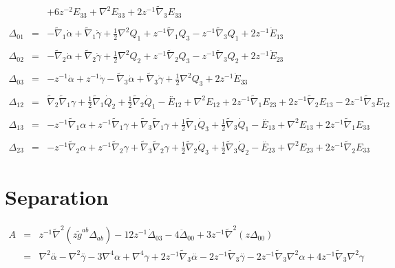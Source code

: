 \documentclass[10pt,letterpaper]{article}
\numberwithin{equation}{section}
\begin{document}
\begin{eqnarray}
&& + 6 z^{-2} E_{33} + \nabla^{2}{}E_{33} + 2 z^{-1} \tilde{\nabla}_{3}E_{33}
\\  \nonumber\\ 
\Delta_{01}&=& - \tilde{\nabla}_{1}\dot{\alpha} + \tilde{\nabla}_{1}\dot{\gamma}+\tfrac{1}{2} \nabla^{2}{}Q_{1} + z^{-1} \tilde{\nabla}_{1}Q_{3} -  z^{-1} \tilde{\nabla}_{3}Q_{1}+2 z^{-1} \dot{E}_{13}
\\  \nonumber\\ 
\Delta_{02}&=& - \tilde{\nabla}_{2}\dot{\alpha} + \tilde{\nabla}_{2}\dot{\gamma}+\tfrac{1}{2} \nabla^{2}{}Q_{2} + z^{-1} \tilde{\nabla}_{2}Q_{3} -  z^{-1} \tilde{\nabla}_{3}Q_{2}+2 z^{-1} \dot{E}_{23}
\\  \nonumber\\ 
\Delta_{03}&=& - z^{-1} \dot{\alpha} + z^{-1} \dot{\gamma} -  \tilde{\nabla}_{3}\dot{\alpha} + \tilde{\nabla}_{3}\dot{\gamma}+\tfrac{1}{2} \nabla^{2}{}Q_{3}+2 z^{-1} \dot{E}_{33}
\\  \nonumber\\ 
\Delta_{12}&=& \tilde{\nabla}_{2}\tilde{\nabla}_{1}\gamma +\tfrac{1}{2} \tilde{\nabla}_{1}\dot{Q}_{2} + \tfrac{1}{2} \tilde{\nabla}_{2}\dot{Q}_{1}- \overset{..}{E}_{12} + \nabla^{2}{}E_{12} + 2 z^{-1} \tilde{\nabla}_{1}E_{23} + 2 z^{-1} \tilde{\nabla}_{2}E_{13} - 2 z^{-1} \tilde{\nabla}_{3}E_{12}
\\  \nonumber\\ 
\Delta_{13}&=& - z^{-1} \tilde{\nabla}_{1}\alpha + z^{-1} \tilde{\nabla}_{1}\gamma + \tilde{\nabla}_{3}\tilde{\nabla}_{1}\gamma +\tfrac{1}{2} \tilde{\nabla}_{1}\dot{Q}_{3} + \tfrac{1}{2} \tilde{\nabla}_{3}\dot{Q}_{1}- \overset{..}{E}_{13} + \nabla^{2}{}E_{13} + 2 z^{-1} \tilde{\nabla}_{1}E_{33}
\\  \nonumber\\ 
\Delta_{23}&=& - z^{-1} \tilde{\nabla}_{2}\alpha + z^{-1} \tilde{\nabla}_{2}\gamma + \tilde{\nabla}_{3}\tilde{\nabla}_{2}\gamma +\tfrac{1}{2} \tilde{\nabla}_{2}\dot{Q}_{3} + \tfrac{1}{2} \tilde{\nabla}_{3}\dot{Q}_{2}- \overset{..}{E}_{23} + \nabla^{2}{}E_{23} + 2 z^{-1} \tilde{\nabla}_{2}E_{33}
\end{eqnarray}
%
%
\section{Separation}
\begin{eqnarray}
A &=& z^{-1}\tilde\nabla^2(z \tilde g^{ab}\Delta_{ab}) -12 z^{-1} \dot \Delta_{03}-4\ddot \Delta_{00}+3z^{-1}\tilde\nabla^2(z\Delta_{00})
\nonumber\\
&=& \nabla^{2}{}\overset{..}{\alpha} -  \nabla^{2}{}\overset{..}{\gamma} - 3 \nabla^{4}{}\alpha + \nabla^{4}{}\gamma + 2 z^{-1} \tilde{\nabla}_{3}\overset{..}{\alpha} - 2 z^{-1} \tilde{\nabla}_{3}\overset{..}{\gamma} - 2 z^{-1} \tilde{\nabla}_{3}\nabla^{2}{}\alpha + 4 z^{-1} \tilde{\nabla}_{3}\nabla^{2}{}\gamma 
\end{eqnarray}
\end{document}
